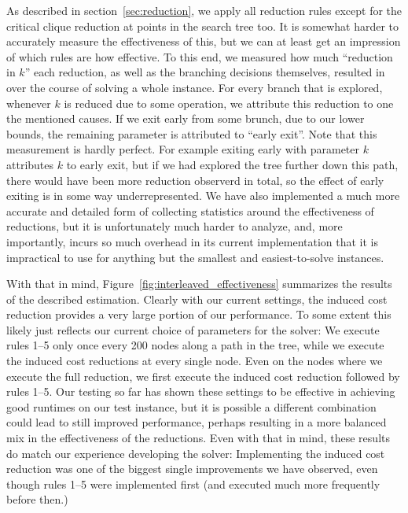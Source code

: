 \documentclass[12pt,oneside,english,parskip=full,headings=small]{scrbook}
\theoremstyle{definition}
\begin{document}
As described in section~\ref{sec:reduction}, we apply all reduction rules except for the critical
clique reduction at points in the search tree too. It is somewhat harder to accurately measure the
effectiveness of this, but we can at least get an impression of which rules are how effective. To
this end, we measured how much ``reduction in $k$'' each reduction, as well as the branching
decisions themselves, resulted in over the course of solving a whole instance. For every branch that
is explored, whenever $k$ is reduced due to some operation, we attribute this reduction to one the
mentioned causes. If we exit early from some brunch, due to our lower bounds, the remaining
parameter is attributed to ``early exit''. Note that this measurement is hardly perfect. For example
exiting early with parameter $k$ attributes $k$ to early exit, but if we had explored the tree
further down this path, there would have been more reduction observerd in total, so the effect of
early exiting is in some way underrepresented. We have also implemented a much more accurate and
detailed form of collecting statistics around the effectiveness of reductions, but it is
unfortunately much harder to analyze, and, more importantly, incurs so much overhead in its current
implementation that it is impractical to use for anything but the smallest and easiest-to-solve
instances.

With that in mind, Figure~\ref{fig:interleaved_effectiveness} summarizes the results of the
described estimation. Clearly with our current settings, the induced cost reduction provides a very
large portion of our performance. To some extent this likely just reflects our current choice of
parameters for the solver: We execute rules 1--5 only once every 200 nodes along a path in the tree,
while we execute the induced cost reductions at every single node. Even on the nodes where we
execute the full reduction, we first execute the induced cost reduction followed by rules 1--5. Our
testing so far has shown these settings to be effective in achieving good runtimes on our test
instance, but it is possible a different combination could lead to still improved performance,
perhaps resulting in a more balanced mix in the effectiveness of the reductions. Even with that in
mind, these results do match our experience developing the solver: Implementing the induced cost
reduction was one of the biggest single improvements we have observed, even though rules 1--5 were
implemented first (and executed much more frequently before then.)
\end{document}
